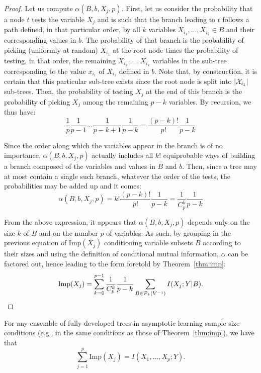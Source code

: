 \begin{proof}
Let us compute $\alpha(B,b,X_j,p)$. First, let us consider the probability that
a node $t$ tests the variable $X_j$ and is such that the branch leading to $t$
follows a path defined, in that particular order, by all $k$ variables $X_{i_1},
..., X_{i_{k}} \in B$ and their corresponding values in $b$. The probability of
that branch is the probability of picking (uniformly at random)  $X_{i_1}$  at
the root node times the probability of testing, in that order, the remaining
$X_{i_2}, ..., X_{i_{k}}$ variables in the sub-tree corresponding to the value
$x_{i_1}$ of $X_{i_1}$ defined in $b$. Note that, by construction, it is certain
that this particular sub-tree exists since the root node is split into $|{\cal
X}_{i_1}|$ sub-trees.  Then, the
probability of testing $X_j$ at the end of this branch is the probability of
picking $X_j$ among the remaining $p-k$ variables. By recursion, we thus have:
\begin{equation}
\frac{1}{p} \frac{1}{p-1} ... \frac{1}{p-k+1} \frac{1}{p-k} = \frac{(p-k)!}{p!} \frac{1}{p-k}
\end{equation}

Since the order along which the variables appear in the branch is of no
importance, $\alpha(B,b,X_j,p)$ actually includes all $k!$ equiprobable ways of
building a branch composed of the variables and values in $B$ and $b$. Then,
since a tree may at most contain a single such branch, whatever the order of the
tests, the probabilities may be added up and it comes:
\begin{equation}
\alpha(B,b,X_j,p)=k! \frac{(p-k)!}{p!} \frac{1}{p-k} = \frac{1}{C_p^k} \frac{1}{p-k}
\end{equation}

From the above expression, it appears that $\alpha(B,b,X_j,p)$ depends only on
the size $k$ of $B$ and on the number $p$ of variables. As such, by grouping in
the previous equation of $\text{Imp}(X_j)$ conditioning variable subsets $B$ according
to their sizes and using the definition of conditional mutual information,
$\alpha$ can be factored out, hence leading to the form foretold by Theorem~\ref{thm:imp}:
\begin{equation}
\text{Imp}(X_j)=\sum_{k=0}^{p-1} \frac{1}{C^k_p} \frac{1}{p-k} \sum_{B \in {\cal P}_k(V^{-j})} I(X_j;Y|B).
\end{equation}
\end{proof}

\begin{theorem}\label{thm:sum-of-imp}
For any ensemble of fully developed trees in asymptotic learning sample size
conditions (e.g., in the same conditions as those of Theorem~\ref{thm:imp}), we
have that
\begin{equation}\label{eqn:sum-of-imp}
\sum_{j=1}^{p} \text{Imp}(X_j) = I(X_{1}, \ldots, X_{p} ; Y).
\end{equation}
\end{theorem}

